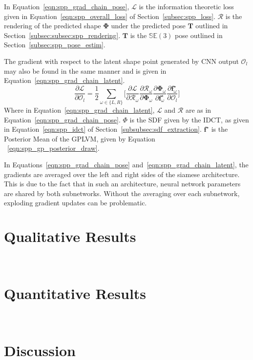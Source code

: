 In Equation~\ref{eqn:spp_grad_chain_pose}, \( \mathcal{L} \) is the information theoretic loss 
given in Equation~\ref{eqn:spp_overall_loss} of Section~\ref{subsec:spp_loss}.
\( \mathcal{R} \) is the rendering of the predicted shape \( \bm{\Phi} \) under the predicted 
pose \( \bm{T} \) outlined in Section~\ref{subsec:subsec:spp_rendering}. \( \bm{T} \) is the 
\( \mathbb{SE}(3) \) pose outlined in Section~\ref{subsec:spp_pose_estim}.

The gradient with respect to the latent shape point generated by CNN output \( \mathcal{O}_{l} \) may 
also be found in the same manner and is given in Equation~\ref{eqn:spp_grad_chain_latent}.
\begin{equation}
  \label{eqn:spp_grad_chain_latent}
  \frac{\partial \mathcal{L}}{\partial \mathcal{O}_{l}} = 
  \frac{1}{2} \sum_{\omega \in \{L, R\}} \Bigg[
    \frac{\partial \mathcal{L}}{\partial \mathcal{R}_{\omega}}
    \frac{\partial \mathcal{R}_{\omega}}{\partial \mathcal{\bm{\Phi}}_{\omega}}
    \frac{\partial \bm{\Phi}_{\omega}}{\partial \bm{f}^{\star}_{\omega}}
    \frac{\partial \bm{f}^{\star}_{\omega}}{\partial \mathcal{O}_{l}}
  \Bigg]
\end{equation}
Where in Equation~\ref{eqn:spp_grad_chain_latent}, \( \mathcal{L} \) and \( \mathcal{R} \) 
are as in Equation~\ref{eqn:spp_grad_chain_pose}. \( \Phi \) is the SDF given by the IDCT, 
as given in Equation~\ref{eqn:spp_idct} of Section~\ref{subsubsec:sdf_extraction}. 
\( \bm{f}^{\star} \) is the Posterior Mean of the GPLVM, given by Equation
~\ref{eqn:spp_gp_posterior_draw}.

In Equations~\ref{eqn:spp_grad_chain_pose} and~\ref{eqn:spp_grad_chain_latent}, the gradients 
are averaged over the left and right sides of the siamese architecture. This is due to the fact 
that in such an architecture, neural network parameters are shared by both subnetworks. Without 
the averaging over each subnetwork, exploding gradient updates can be problematic.

\section{Qualitative Results}
~\label{sec:spp_qualitative}

\section{Quantitative Results}
~\label{sec:spp_quantitative}

\section{Discussion}
~\label{sec:spp_discussion}